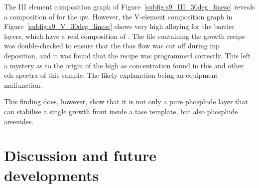 The III element composition graph of Figure~\ref{subfig:s9_III_30deg_linesc} reveals a composition of  for the \acl{qw}. However, the V-element composition graph in Figure~\ref{subfig:s9_V_30deg_linesc} shows very high alloying for the barrier layers, which have a real composition of . The file containing the growth recipe was double-checked to ensure that the \acs{tbas} flow was cut off during \acs{inp} deposition, and it was found that the recipe was programmed correctly. This left a mystery as to the origin of the high \acl{as} concentration found in this and other \acs{eds} spectra of this sample. The likely explanation being an equipment malfunction.

This finding does, however, show that it is not only a pure phosphide layer that can stabilise a single  growth front inside a \acs{tase} template, but also phosphide arsenides.







\section{Discussion and future developments}















